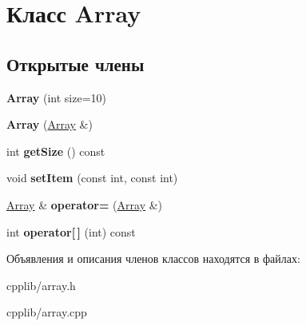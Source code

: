 \hypertarget{classArray}{}\section{Класс Array}
\label{classArray}
\subsection*{Открытые члены}
\begin{DoxyCompactItemize}
\item 
\hypertarget{classArray_ab5d4ce4b6e7f01baa50bb4fa1e512c1e}{}{\bfseries Array} (int size=10)\label{classArray_ab5d4ce4b6e7f01baa50bb4fa1e512c1e}

\item 
\hypertarget{classArray_a28e539f0399f66e16e4812c897389763}{}{\bfseries Array} (\hyperlink{classArray}{Array} \&)\label{classArray_a28e539f0399f66e16e4812c897389763}

\item 
\hypertarget{classArray_a55b032e8e1fe2254332c8e6fed663cb9}{}int {\bfseries get\+Size} () const \label{classArray_a55b032e8e1fe2254332c8e6fed663cb9}

\item 
\hypertarget{classArray_a4dd9ade63918df3e81434c507f1d5c80}{}void {\bfseries set\+Item} (const int, const int)\label{classArray_a4dd9ade63918df3e81434c507f1d5c80}

\item 
\hypertarget{classArray_a2d60e3855d0460f51bdf7630fd3a8f14}{}\hyperlink{classArray}{Array} \& {\bfseries operator=} (\hyperlink{classArray}{Array} \&)\label{classArray_a2d60e3855d0460f51bdf7630fd3a8f14}

\item 
\hypertarget{classArray_a6a42238e48f537fd7fbd8696c7ad8135}{}int {\bfseries operator\mbox{[}$\,$\mbox{]}} (int) const \label{classArray_a6a42238e48f537fd7fbd8696c7ad8135}

\end{DoxyCompactItemize}


Объявления и описания членов классов находятся в файлах\+:\begin{DoxyCompactItemize}
\item 
cpplib/array.\+h\item 
cpplib/array.\+cpp\end{DoxyCompactItemize}
